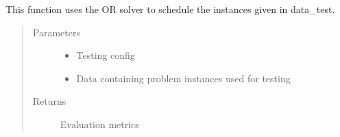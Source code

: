 \documentclass[letterpaper,10pt,english]{sphinxmanual}
\begin{document}
\begin{fulllineitems}
\label{\detokenize{agents.reinforcement_learning:agents.test.test_solver}}
\sphinxAtStartPar
This function uses the OR solver to schedule the instances given in data\_test.
\begin{quote}\begin{description}
\item[{Parameters}] \leavevmode\begin{itemize}
\item {} 
\sphinxAtStartPar
{} \textendash{} Testing config

\item {} 
\sphinxAtStartPar
{} \textendash{} Data containing problem instances used for testing

\end{itemize}

\item[{Returns}] \leavevmode
\sphinxAtStartPar
Evaluation metrics

\end{description}\end{quote}

\end{fulllineitems}

\end{document}
